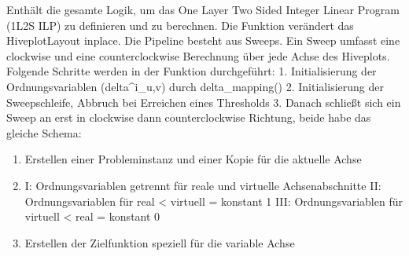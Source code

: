 \documentclass[a4paper,10pt,ngerman]{sphinxmanual}
\begin{document}
\begin{fulllineitems}
\label{\detokenize{api:src.ip_model.onelayer_twosided_optimization}}
\pysigstartsignatures
\pysiglinewithargsret
{}
{\sphinxparamcomma {}\sphinxparamcomma {}\sphinxparamcomma {}\sphinxparamcomma {}\sphinxparamcomma {}}
{}
\pysigstopsignatures
\sphinxAtStartPar
Enthält die gesamte Logik, um das One Layer Two Sided Integer Linear Program (1L2S ILP) zu definieren und zu berechnen. Die Funktion verändert das HiveplotLayout in\sphinxhyphen{}place. Die Pipeline besteht aus Sweeps.
Ein Sweep umfasst eine clockwise und eine counterclockwise Berechnung über jede Achse des Hiveplots. Folgende Schritte werden in der Funktion durchgeführt:
1. Initialisierung der Ordnungsvariablen (delta\textasciicircum{}i\_u,v) durch delta\_mapping()
2. Initialisierung der Sweepschleife, Abbruch bei Erreichen eines Thresholds
3. Danach schließt sich ein Sweep an erst in clockwise dann counterclockwise Richtung, beide habe das gleiche Schema:
\begin{enumerate}
%
\item {} 
\sphinxAtStartPar
Erstellen einer Probleminstanz und einer Kopie für die aktuelle Achse

\item {} \begin{description}
\sphinxAtStartPar
I: Ordnungsvariablen getrennt für reale und virtuelle Achsenabschnitte
II: Ordnungsvariablen für real \textless{} virtuell = konstant 1
III: Ordnungsvariablen für virtuell \textless{} real = konstant 0

\end{description}

\item {} 
\sphinxAtStartPar
Erstellen der Zielfunktion speziell für die variable Achse


\end{enumerate}
\end{fulllineitems}
\end{document}
